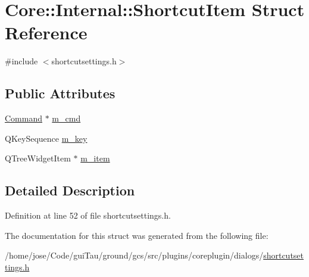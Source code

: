\hypertarget{struct_core_1_1_internal_1_1_shortcut_item}{\section{Core\-:\-:Internal\-:\-:Shortcut\-Item Struct Reference}
\label{struct_core_1_1_internal_1_1_shortcut_item}
}


{\ttfamily \#include $<$shortcutsettings.\-h$>$}

\subsection*{Public Attributes}
\begin{DoxyCompactItemize}
\item 
\hyperlink{class_core_1_1_command}{Command} $\ast$ \hyperlink{group___core_plugin_ga10e0ddc6c4c316f39a3b00b92083148a}{m\-\_\-cmd}
\item 
Q\-Key\-Sequence \hyperlink{group___core_plugin_ga8d081cf37bef5964c2751dc5a1947480}{m\-\_\-key}
\item 
Q\-Tree\-Widget\-Item $\ast$ \hyperlink{group___core_plugin_ga318cf2024e20ff1114f406d188f3f3c7}{m\-\_\-item}
\end{DoxyCompactItemize}


\subsection{Detailed Description}


Definition at line 52 of file shortcutsettings.\-h.



The documentation for this struct was generated from the following file\-:\begin{DoxyCompactItemize}
\item 
/home/jose/\-Code/gui\-Tau/ground/gcs/src/plugins/coreplugin/dialogs/\hyperlink{shortcutsettings_8h}{shortcutsettings.\-h}\end{DoxyCompactItemize}
